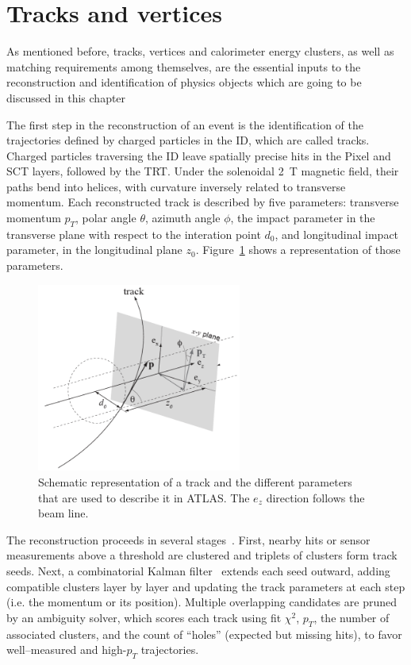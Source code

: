 \section{Tracks and vertices}
\label{sec:tracks}

As mentioned before, tracks, vertices and calorimeter energy clusters, as well as matching requirements among themselves, are the essential inputs to the reconstruction and identification of physics objects which are going to be discussed in this chapter

The first step in the reconstruction of an event is the identification of the trajectories defined by charged particles in the ID, which are called tracks.
Charged particles traversing the ID leave spatially precise hits in the Pixel and SCT layers, followed by the TRT. Under the solenoidal 2~T magnetic field, their paths bend into helices, with curvature inversely related to transverse momentum. 
Each reconstructed track is described by five parameters: transverse momentum \(p_T\), polar angle \(\theta\), azimuth angle \(\phi\), the impact parameter in the transverse plane with respect to the interation point \(d_0\), and longitudinal impact parameter, in the longitudinal plane \(z_0\). Figure~\ref{fig:tracks} shows a representation of those parameters.

\begin{figure}[htbp]
  \centering
  \includegraphics[width=0.6\textwidth]{images/tracks.png}
  \caption{Schematic representation of a track and the different parameters that are used to describe it in ATLAS. The $e_z$ direction follows the beam line\cite{Bianchi:2837191}.}
  \label{fig:tracks}
 \end{figure}

The reconstruction proceeds in several stages~\cite{tracks}. First, nearby hits or sensor measurements above a threshold are clustered and triplets of clusters form track seeds. Next, a combinatorial Kalman filter~\cite{kalman} extends each seed outward, adding compatible clusters layer by layer and updating the track parameters at each step (i.e. the momentum or its position). Multiple overlapping candidates are pruned by an ambiguity solver, which scores each track using fit \(\chi^2\), \(p_T\), the number of associated clusters, and the count of “holes” (expected but missing hits), to favor well–measured and high-\(p_T\) trajectories.


